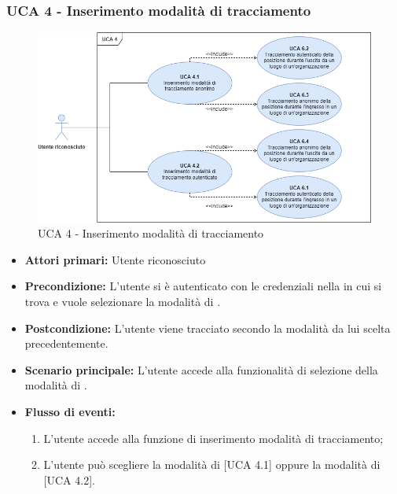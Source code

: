 \subsubsection{UCA 4 - Inserimento modalità di tracciamento}%

\begin{figure}[h]
	\centering	
	\includegraphics[scale=0.53, center]{Sezioni/UseCase/Immagini/UCA4.png}
	\caption{UCA 4 - Inserimento modalità di tracciamento}
\end{figure}

\begin{itemize}
	\item \textbf{Attori primari:} Utente riconosciuto
	\item \textbf{Precondizione:} L'utente si è autenticato con le credenziali  nella  in cui si trova e vuole selezionare la modalità di .
	\item \textbf{Postcondizione:} L'utente viene tracciato secondo la modalità da lui scelta precedentemente.
	\item \textbf{Scenario principale:} L'utente accede alla funzionalità di selezione della modalità di .
	\item \textbf{Flusso di eventi:}
	\begin{enumerate}
		\item L'utente accede alla funzione di inserimento modalità di tracciamento;
		\item L'utente può scegliere la modalità di  [UCA 4.1] oppure la modalità di  [UCA 4.2].
	\end{enumerate}
\end{itemize}


